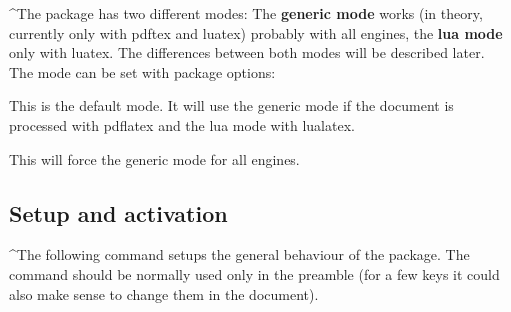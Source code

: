 \documentclass[DIV=12,parskip=half-,bibliography=totoc]{scrartcl}
\begin{document}
\TagP^The package has two different modes: The \textbf{generic mode} works (in theory, currently only with pdftex and luatex) probably with all engines, the \textbf{lua mode} only with luatex. The differences between both modes  will be described later. The mode can be set with package options:


\TagP This is the default mode. It will use the generic mode if the document is processed with pdflatex and the lua mode with lualatex.


\TagP This will force the generic mode for all engines. \TagPend




\subsection{Setup and activation}\label{ssec:setup}

\TagP^The following command setups the general behaviour of the package. The command should be normally used only in the preamble (for a few keys it could also make sense to change them in the document).


\DescribeMacro{}
\end{document}
